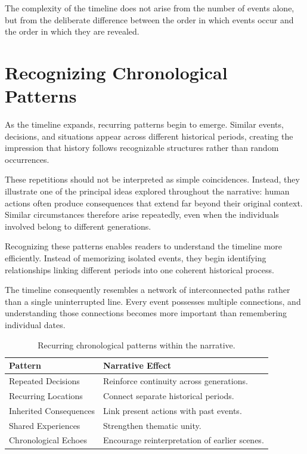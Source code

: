 \documentclass[12pt,oneside,openany]{book}
\begin{document}
\begin{tcolorbox}[colback=blue!5,colframe=blue!60!black,title=Analysis]
The complexity of the timeline does not arise from the number of events alone,
but from the deliberate difference between the order in which events occur and
the order in which they are revealed.
\end{tcolorbox}
\section{Recognizing Chronological Patterns}

As the timeline expands, recurring patterns begin to emerge. Similar events,
decisions, and situations appear across different historical periods, creating
the impression that history follows recognizable structures rather than random
occurrences.

These repetitions should not be interpreted as simple coincidences. Instead,
they illustrate one of the principal ideas explored throughout the narrative:
human actions often produce consequences that extend far beyond their original
context. Similar circumstances therefore arise repeatedly, even when the
individuals involved belong to different generations.

Recognizing these patterns enables readers to understand the timeline more
efficiently. Instead of memorizing isolated events, they begin identifying
relationships linking different periods into one coherent historical process.

The timeline consequently resembles a network of interconnected paths rather
than a single uninterrupted line. Every event possesses multiple connections,
and understanding those connections becomes more important than remembering
individual dates.

\begin{table}[H]
\centering
\begin{tabular}{|p{4cm}|p{8cm}|}
\hline
\textbf{Pattern} & \textbf{Narrative Effect}\\
\hline
Repeated Decisions & Reinforce continuity across generations.\\
\hline
Recurring Locations & Connect separate historical periods.\\
\hline
Inherited Consequences & Link present actions with past events.\\
\hline
Shared Experiences & Strengthen thematic unity.\\
\hline
Chronological Echoes & Encourage reinterpretation of earlier scenes.\\
\hline
\end{tabular}
\caption{Recurring chronological patterns within the narrative.}
\end{table}
\end{document}
